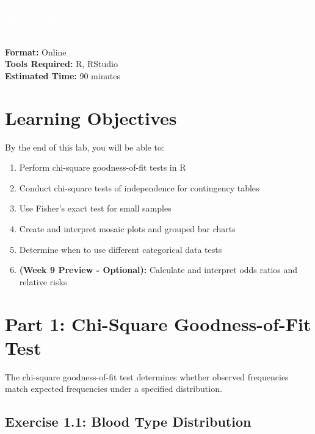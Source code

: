 \documentclass[11pt]{article}
\title{}
\author{}
\date{}
\begin{document}
\begin{tcolorbox}[colback=osaorange,colframe=black,boxrule=2pt,arc=0pt,left=3pt,right=3pt,top=6pt,bottom=6pt,boxsep=2pt]
\centering
\textcolor{white}{\textbf{\Large H524 Introduction to Biostatistics}}\\
\textcolor{white}{\textbf{\Large Week 8 Lab: Contingency Tables and Chi-Square Tests}}\\
\textcolor{white}{\textbf{\Large Fall 2025}}
\end{tcolorbox}

\vspace{8pt}

\noindent\textbf{Format:} Online\\
\textbf{Tools Required:} R, RStudio\\
\textbf{Estimated Time:} 90 minutes

\section{Learning Objectives}

By the end of this lab, you will be able to:
\begin{enumerate}
\item Perform chi-square goodness-of-fit tests in R
\item Conduct chi-square tests of independence for contingency tables
\item Use Fisher's exact test for small samples
\item Create and interpret mosaic plots and grouped bar charts
\item Determine when to use different categorical data tests
\item \textbf{(Week 9 Preview - Optional):} Calculate and interpret odds ratios and relative risks
\end{enumerate}

\section{Part 1: Chi-Square Goodness-of-Fit Test}

The chi-square goodness-of-fit test determines whether observed frequencies match expected frequencies under a specified distribution.

\subsection{Exercise 1.1: Blood Type Distribution}
\end{document}
